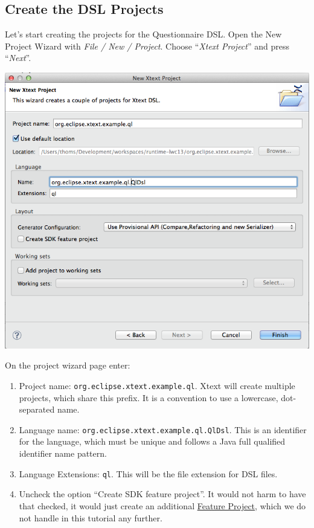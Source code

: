 \subsection{Create the DSL Projects} \label{chp:CreateDslProjects}

Let's start creating the projects for the Questionnaire DSL. Open the New
Project Wizard with \emph{File / New / Project}. Choose ``\emph{Xtext Project}'' and press
``\emph{Next}''.

\includegraphics[width=14cm]{./images/chapter01/NewXtextProjectWizard.png}

On the project wizard page enter:
\begin{enumerate}
  \item Project name: \texttt{org.eclipse.xtext.example.ql}. Xtext will create
  multiple projects, which share this prefix. It is a convention to use
  a lowercase, dot-separated name.
  \item Language name: \texttt{org.eclipse.xtext.example.ql.QlDsl}. This is an
  identifier for the language, which must be unique and follows a Java
  full qualified identifier name pattern.
  \item Language Extensions: \texttt{ql}. This will be the file extension for
  DSL files.
  \item Uncheck the option ``Create SDK feature project''. It would not harm to
  have that checked, it would just create an additional
  \href{http://www.vogella.com/articles/EclipseFeatureProject/article.html}{Feature
  Project}, which we do not handle in this tutorial any further.
\end{enumerate}

